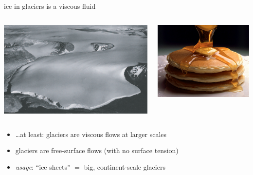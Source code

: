 \documentclass[hide notes,intlimits]{beamer}
\begin{document}
\begin{frame}{ice in glaciers is a viscous fluid}
\begin{columns}
\begin{column}{0.65\textwidth}
\includegraphics[width=1.0\textwidth]{polaris}
\end{column}
\begin{column}{0.35\textwidth}
\includegraphics[width=1.0\textwidth]{pancakes}
\end{column}
\end{columns}

\bigskip\bigskip
\begin{itemize}
\item \dots at least: glaciers are viscous flows at larger scales
\item glaciers are free-surface flows (with no surface tension)
\item \emph{usage}: ``ice sheets'' $=$ big, continent-scale glaciers
\end{itemize}
\end{frame}
\end{document}
